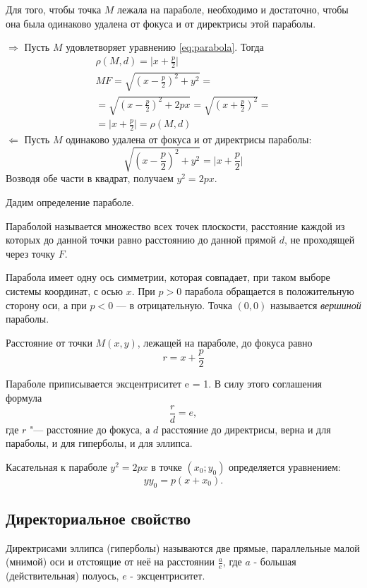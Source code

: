 \begin{theorem}
  Для того, чтобы точка $M$ лежала
  на параболе, необходимо и достаточно, чтобы она была одинаково удалена от фокуса и от директрисы этой параболы.
\end{theorem}
\begin{Proof}
  $\Rightarrow$ Пусть $M$ удовлетворяет уравнению \ref{eq:parabola}. Тогда
  \begin{gather*}
    \rho (M, d) = \mathopen|x + \frac{p}{2}\mathclose| \\
    MF = \sqrt{(x - \frac{p}{2})^2 + y^2} = \\
    = \sqrt{(x - \frac{p}{2})^2 + 2px} = \sqrt{(x + \frac{p}{2})^2} =  \\
    = \mathopen|x + \frac{p}{2}\mathclose| = \rho (M, d)
  \end{gather*}
  $\Leftarrow$ Пусть $M$ одинаково удалена от фокуса и от директрисы параболы:
  $$
    \sqrt{(x - \frac{p}{2})^2 + y^2} = \mathopen|x + \frac{p}{2}\mathclose|
  $$
  Возводя обе части в квадрат, получаем $y^2 = 2px$.
\end{Proof}
Дадим определение параболе.
\begin{definition}
  Параболой называется множество всех точек плоскости, расстояние каждой из которых до данной точки равно расстоянию до данной прямой $d$, не проходящей через точку $F$.
\end{definition}
Парабола имеет одну ось симметрии, которая совпадает, при таком выборе системы координат, с осью $x$. При $p > 0$ парабола обращается в положительную сторону оси, а при $p < 0$ — в отрицательную. Точка $(0,0)$ называется \textit{вершиной} параболы.

Расстояние от
точки $M(x, y)$, лежащей на параболе, до
фокуса равно
$$
  r = x + \frac{p}{2}
$$

Параболе приписывается эксцентриситет e = 1. В силу этого соглашения формула
$$
  \frac{r}{d} = e,
$$ где $r$ "--- расстояние до фокуса, а $d$ расстояние до директрисы, верна и для параболы, и для гиперболы, и для эллипса.

Касательная к параболе $y^2 = 2px$ в точке $(x_0; y_0)$ определяется уравнением:
$$
  yy_0 = p(x + x_0).
$$

\subsection*{Директориальное свойство}
\begin{definition}
  Директрисами эллипса (гиперболы) называются две прямые, параллельные малой (мнимой) оси и отстоящие от неё на расстоянии $\frac{a}{e}$, где $a$ -
  большая (действительная) полуось, $e$ - эксцентриситет.
\end{definition}

